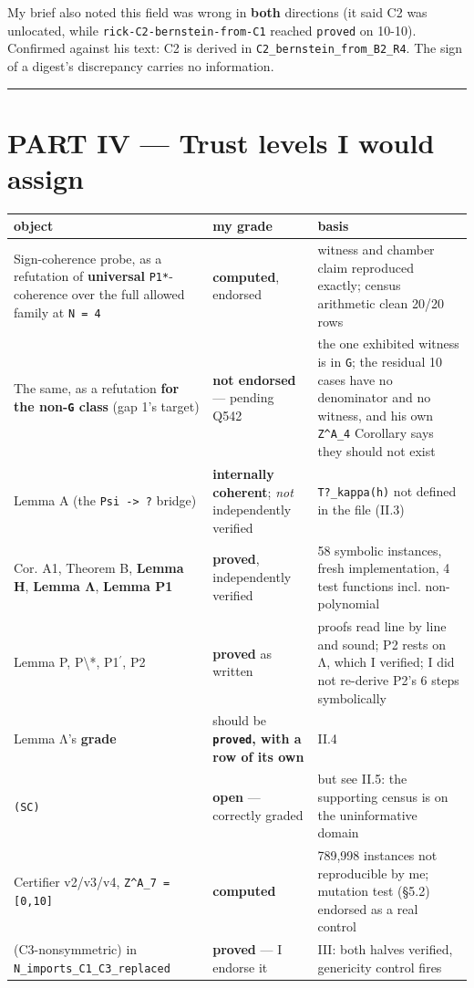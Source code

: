 \documentclass[11pt,a4paper]{article}
\begin{document}
My brief also noted this field was wrong in \textbf{both} directions (it said C2 was unlocated, while \mbox{\texttt{rick-C2-bernstein-from-C1}} reached \mbox{\texttt{proved}} on 10-10). Confirmed against his text: C2 is derived in \mbox{\texttt{C2\_bernstein\_from\_B2\_R4}}. The sign of a digest's discrepancy carries no information.

\medskip\hrule\medskip

\section*{PART IV --- Trust levels I would assign}

\begin{center}\footnotesize
\begin{tabular}{@{}p{}p{}p{}@{}}
\hline
\textbf{object} & \textbf{my grade} & \textbf{basis}\\ \hline
Sign-coherence probe, as a refutation of \textbf{universal} \mbox{\texttt{P1*}}-coherence over the full allowed family at \mbox{\texttt{N = 4}} & \textbf{computed}, endorsed & witness and chamber claim reproduced exactly; census arithmetic clean 20/20 rows\\
The same, as a refutation \textbf{for the non-\mbox{\texttt{G}} class} (gap 1's target) & \textbf{not endorsed} --- pending Q542 & the one exhibited witness is in \mbox{\texttt{G}}; the residual 10 cases have no denominator and no witness, and his own \mbox{\texttt{Z\textasciicircum{}A\_4}} Corollary says they should not exist\\
Lemma A (the \mbox{\texttt{Psi -> ?}} bridge) & \textbf{internally coherent}; \emph{not} independently verified & \mbox{\texttt{T?\_kappa(h)}} not defined in the file (II.3)\\
Cor. A1, Theorem B, \textbf{Lemma H}, \textbf{Lemma Λ}, \textbf{Lemma P1} & \textbf{proved}, independently verified & 58 symbolic instances, fresh implementation, 4 test functions incl. non-polynomial\\
Lemma P, P\textbackslash{}*, P1$^{\prime}$, P2 & \textbf{proved} as written & proofs read line by line and sound; P2 rests on Λ, which I verified; I did not re-derive P2's 6 steps symbolically\\
Lemma Λ's \textbf{grade} & should be \textbf{\mbox{\texttt{proved}}, with a row of its own} & II.4\\
\mbox{\texttt{(SC)}} & \textbf{open} --- correctly graded & but see II.5: the supporting census is on the uninformative domain\\
Certifier v2/v3/v4, \mbox{\texttt{Z\textasciicircum{}A\_7 = [0,10]}} & \textbf{computed} & 789,998 instances not reproducible by me; mutation test (\S{}5.2) endorsed as a real control\\
(C3-nonsymmetric) in \mbox{\texttt{N\_imports\_C1\_C3\_replaced}} & \textbf{proved} --- I endorse it & III: both halves verified, genericity control fires\\
\hline\end{tabular}\end{center}
\end{document}
